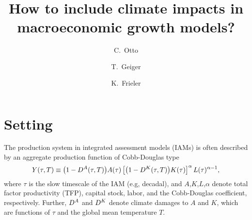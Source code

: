 \documentclass[preprint,3p,authoryear]{elsarticle}
\begin{document}

\begin{frontmatter}

  \title{How to include climate impacts in macroeconomic growth models?}

\author[PIK]{C.~Otto}



\author[PIK]{T.~Geiger}
\author[PIK]{K.~Frieler}


\address[PIK]{Potsdam Institute for Climate Impact Research, Potsdam, Germany}




\end{frontmatter}



\section{Setting}
\label{sec:set}
The production system in integrated assessment models (IAMs) is often described by an aggregate production function of Cobb-Douglas type
\begin{equation}
  \label{eq:CD}
  Y(\tau,T)\equiv \big(1-D^A(\tau,T)\big)A(\tau)\left[\big(1-D^K(\tau,T)\big)K(\tau) \right]^\alpha L(\tau)^{\alpha-1},
\end{equation}
where $\tau$ is the slow timescale of the IAM (e.g, decadal), and $A$,$K$,$L$,$\alpha$ denote total factor productivity (TFP), capital stock, labor, and the Cobb-Douglas coefficient, respectively. Further, $D^A$ and $D^K$ denote climate damages to $A$ and $K$, which are functions of $\tau$ and the global mean temperature $T$.
\end{document}
